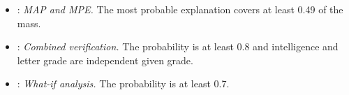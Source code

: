 \begingroup\raggedright
\begin{itemize}[nosep,leftmargin=*]
\item {}: \emph{MAP and MPE.}  The most probable explanation covers at least 0.49 of the mass.
\item {}: \emph{Combined verification.}  The probability is at least 0.8 and intelligence and letter grade are independent given grade.
\item {}: \emph{What-if analysis.}  The probability is at least 0.7.
\end{itemize}
\endgroup
